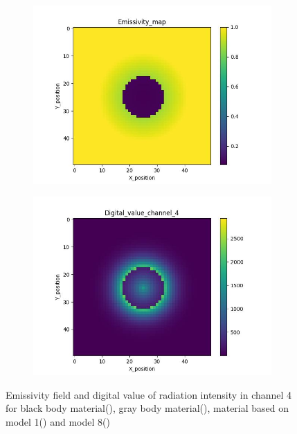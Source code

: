 {\begin{figure}[htbp]
\begin{minipage}{\textwidth}
    \end{minipage}\\
    \begin{minipage}{\textwidth}
        \centering
        \begin{subfigure}{0.45\textwidth}
            \includegraphics[width=\textwidth]{figures/raw_data/32/emi_field.jpg}
        \end{subfigure}
        \begin{subfigure}{0.45\textwidth}
            \centering
            \includegraphics[width=\textwidth]{figures/raw_data/32/digital_value_channel_4.jpg}
        \end{subfigure}
        \label{fig: raw_data_32}
    \end{minipage}
    \caption{Emissivity field and digital value of radiation intensity in channel 4 for 
    black body material(), gray body material(), 
    material based on model 1() and model 8()}
    \label{fig: raw_data}
\end{figure}}

